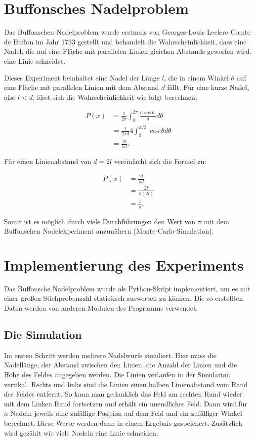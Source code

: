 \documentclass[10pt,twocolumn]{scrartcl}
\begin{document}
\section{Buffonsches Nadelproblem}
	\label{chap_buffon_needle}
	Das Buffonschen Nadelproblem wurde erstmals von Georges-Louis Leclerc Comte de Buffon im Jahr 1733 gestellt und behandelt die Wahrscheinlichkeit, dass eine Nadel, die auf eine Fläche mit parallelen Linien gleichen Abstands geworfen wird, eine Linie schneidet.
	
	Dieses Experiment beinhaltet eine Nadel der Länge $l$, die in einem Winkel $\theta$ auf eine Fläche mit parallelen Linien mit dem Abstand $d$ fällt. Für eine kurze Nadel, also $l < d$, lässt sich die Wahrscheinlichkeit wie folgt berechnen: \cite{MathWorld}

	\begin{align}
		P(x) &= \frac{1}{2\pi}\int_{0}^{2\pi}\frac{l|\cos{\theta}|}{d}d\theta \\ 
		&= \frac{l}{2 \pi d} 4 \int_{0}^{\pi/2}\cos{\theta}d\theta  \nonumber \\
		&= \frac{2l}{\pi d} \nonumber .
	\end{align}
	
	Für einen Linienabstand von $d=2l$ vereinfacht sich die Formel zu:
	
	\begin{align}
		P(x) &= \frac{2l}{\pi d} \nonumber \\ 
		&= \frac{2l}{\pi (2l)} \nonumber \\
		&= \frac{1}{\pi} .
	\end{align}
	
	Somit ist es möglich durch viele Durchführungen den Wert von $\pi$ mit dem Buffonschen Nadelexperiment anzunähern (Monte-Carlo-Simulation).

\section{Implementierung des Experiments}
	Das Buffonsche Nadelproblem wurde als Python-Skript implementiert, um es mit einer großen Stichprobenzahl statistisch auswerten zu können. Die so erstellten Daten werden von anderen Modulen des Programms verwendet.

	\subsection{Die Simulation}
		\label{chap_sim_results}
		Im ersten Schritt werden mehrere Nadelwürfe simuliert. Hier muss die Nadellänge, der Abstand zwischen den Linien, die Anzahl der Linien und die Höhe des Feldes angegeben werden. Die Linien verlaufen in der Simulation vertikal. Rechts und links sind die Linien einen halben Linienabstand vom Rand des Feldes entfernt. So kann man gedanklich das Feld am rechten Rand wieder mit dem Linken Rand fortsetzen und erhält ein unendliches Feld. Dann wird für $n$ Nadeln jeweils eine zufällige Position auf dem Feld und ein zufälliger Winkel berechnet. Diese Werte werden dann in einem Ergebnis gespeichert. Zusätzlich wird gezählt wie viele Nadeln eine Linie schneiden.
\end{document}
